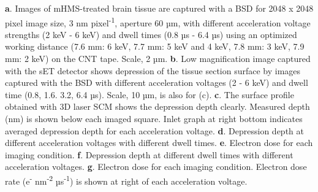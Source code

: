 \documentclass{article}
\begin{document}
\textbf{a}. Images of mHMS-treated brain tissue are captured with a BSD for 2048 x 2048 pixel image size, 3 nm pixel\textsuperscript{-1}, aperture 60 µm, with different acceleration voltage strengths (2 keV - 6 keV) and dwell times (0.8 µs - 6.4 µs) using an optimized working distance (7.6 mm: 6 keV, 7.7 mm: 5 keV and 4 keV, 7.8 mm: 3 keV, 7.9 mm: 2 keV) on the CNT tape. Scale, 2 µm. \textbf{b}. Low magnification image captured with the sET detector shows depression of the tissue section surface by images captured with the BSD with different acceleration voltages (2 - 6 keV) and dwell time (0.8, 1.6. 3.2, 6.4 µs). Scale, 10 µm, is also for (c). \textbf{c}. The surface profile obtained with 3D laser SCM shows the depression depth clearly. Measured depth (nm) is shown below each imaged square. Inlet graph at right bottom indicates averaged depression depth for each acceleration voltage. \textbf{d}. Depression depth at different acceleration voltages with different dwell times. \textbf{e}. Electron dose for each imaging condition. \textbf{f}. Depression depth at different dwell times with different acceleration voltages. \textbf{g}. Electron dose for each imaging condition. Electron dose rate (e\textsuperscript{-} nm\textsuperscript{-2} µs\textsuperscript{-1}) is shown at right of each acceleration voltage.
\end{document}
